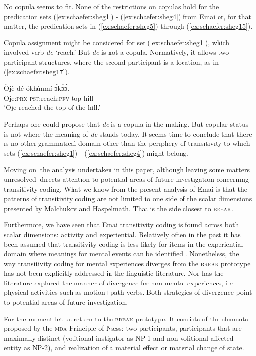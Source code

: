 \documentclass[output=paper,colorlinks,citecolor=brown
]{langscibook}
\begin{document}
No copula seems to fit. None of the restrictions on copulas hold for the predication sets (\ref{ex:schaefer:sheg1}) - (\ref{ex:schaefer:sheg4}) from Emai or, for that matter, the predication sets in (\ref{ex:schaefer:sheg5}) through (\ref{ex:schaefer:sheg15}). 

Copula assignment might be considered for set (\ref{ex:schaefer:sheg1}), which involved verb \textit{de} ‘reach.’ But \textit{de} is not a copula. Normatively, it allows two-participant structures, where the second participant is a location, as in (\ref{ex:schaefer:sheg17}).  

  \ea \label{ex:schaefer:sheg17}
    \gll Òjè dé ókhúnmí ɔ́kɔ̀ɔ́. \\
         Oje:\textsc{prx} \textsc{pst}:reach:\textsc{pfv} top hill \\
           \glt ‘Oje reached the top of the hill.’
\z	
 
Perhaps one could propose that \textit{de} is a copula in the making. But copular status is not where the meaning of \textit{de} stands today. It seems time to conclude that there is no other grammatical domain other than the periphery of transitivity to which sets (\ref{ex:schaefer:sheg1}) - (\ref{ex:schaefer:sheg4}) might belong.   

Moving on, the analysis undertaken in this paper, although leaving some matters unresolved, directs attention to potential areas of future investigation concerning transitivity coding. What we know from the present analysis of Emai is that the patterns of transitivity coding are not limited to one side of the scalar dimensions presented by Malchukov and Haspelmath. That is the side closest to \textsc{break}. 

Furthermore, we have seen that Emai transitivity coding is found across both scalar dimensions: activity and experiential. Relatively often in the past it has been assumed that transitivity coding is less likely for items in the experiential domain where meanings for mental events can be identified \citep{Croft1993}. Nonetheless, the way transitivity coding for mental experiences diverges from the \textsc{break} prototype has not been explicitly addressed in the linguistic literature. Nor has the literature explored the manner of divergence for non-mental experiences, i.e. physical activities such as motion+path verbs. Both strategies of divergence point to potential areas of future investigation. 

For the moment let us return to the \textsc{break} prototype. It consists of the elements proposed by the \textsc{mda} Principle of Næss: two participants, participants that are maximally distinct (volitional instigator as NP-1 and non-volitional affected entity as NP-2), and realization of a material effect or material change of state.  
\end{document}

